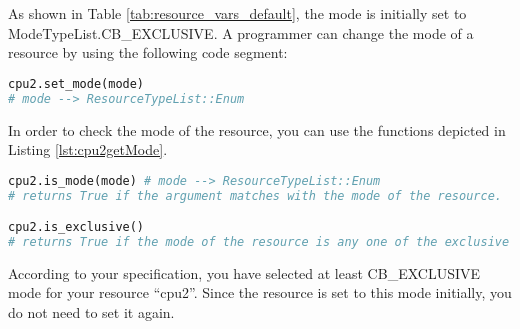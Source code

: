 \documentclass[]{scrartcl}
\begin{document}
As shown in Table \ref{tab:resource_vars_default}, the mode is initially set to \textsf{ModeTypeList.CB\_EXCLUSIVE}. A programmer can change the mode of a resource by using the following code segment:

\begin{lstlisting}[language=Python, frame=single, label={lst:cpu2setMode}, caption={Setting the mode of a resource after creating a resource.}]
cpu2.set_mode(mode)
# mode --> ResourceTypeList::Enum
\end{lstlisting}
        

In order to check the mode of the resource, you can use the functions depicted in Listing \ref{lst:cpu2getMode}.

\begin{lstlisting}[language=Python, frame=single, label={lst:cpu2getMode}, caption={The functions for resource mode check.}]
cpu2.is_mode(mode) # mode --> ResourceTypeList::Enum
# returns True if the argument matches with the mode of the resource.

cpu2.is_exclusive()
# returns True if the mode of the resource is any one of the exclusive mode.
\end{lstlisting}
        
        
According to your specification, you have selected at least \textsf{CB\_EXCLUSIVE} mode for your resource ``cpu2''. Since the resource is set to this mode initially, you do not need to set it again.
        
\end{document}

